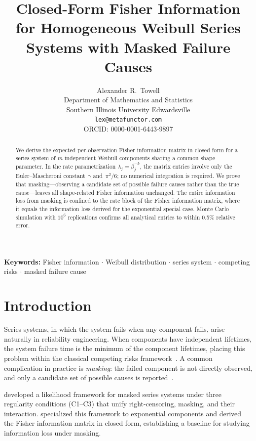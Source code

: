 \documentclass[12pt]{article}
\title{Closed-Form Fisher Information for Homogeneous Weibull Series
  Systems with Masked Failure Causes}
\author{Alexander R.\ Towell\\
  \small Department of Mathematics and Statistics\\
  \small Southern Illinois University Edwardsville\\
  \small \texttt{lex@metafunctor.com}\\
  \small ORCID: 0000-0001-6443-9897}
\date{}
\theoremstyle{remark}
\begin{document}
\maketitle

\begin{abstract}
We derive the expected per-observation Fisher information matrix in
closed form for a series system of $m$ independent Weibull components
sharing a common shape parameter.  In the rate parametrization
$\lambda_j = \beta_j^{-k}$, the matrix entries involve only the
Euler--Mascheroni constant~$\gamma$ and~$\pi^2/6$; no numerical
integration is required.  We prove that masking---observing a candidate
set of possible failure causes rather than the true cause---leaves all
shape-related Fisher information unchanged.  The entire information loss
from masking is confined to the rate block of the Fisher information
matrix, where it equals the information loss derived for the exponential
special case.  Monte Carlo simulation with $10^6$ replications confirms
all analytical entries to within 0.5\% relative error.
\end{abstract}

\noindent\textbf{Keywords:}
Fisher information $\cdot$
Weibull distribution $\cdot$
series system $\cdot$
competing risks $\cdot$
masked failure cause


\section{Introduction}\label{sec:intro}

Series systems, in which the system fails when any component fails,
arise naturally in reliability engineering.  When components have
independent lifetimes, the system failure time is the minimum of the
component lifetimes, placing this problem within the classical competing
risks framework~\citep{crowder2001}.  A common complication in practice
is \emph{masking}: the failed component is not directly observed, and
only a candidate set of possible causes is
reported~\citep{miyakawa1984}.

\citet{towell2025masked} developed a likelihood framework for masked
series systems under three regularity conditions (C1--C3) that unify
right-censoring, masking, and their interaction.
\citet{towell2026exponential} specialized this framework to exponential
components and derived the Fisher information matrix in closed form,
establishing a baseline for studying information loss under masking.
\end{document}

